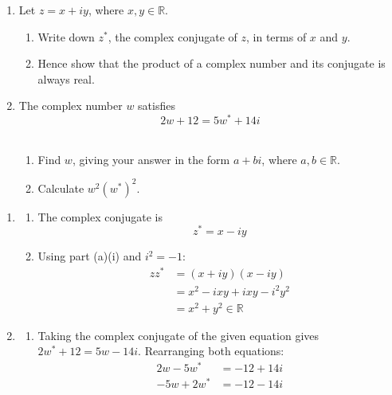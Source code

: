 \documentclass[leqno]{article}
\begin{document}
\djsFrontMatter
\begin{enumerate}[
  label=\textbf{\arabic*.},
  leftmargin=*,
  topsep=0pt,
  partopsep=0pt,
  parsep=0pt
]

\questionitem

\begin{enumerate}[label=\textbf{(\alph*)}]
\item Let $z=x+iy$, where $x,y\in\mathbb{R}$. \\
\begin{enumerate}[label=(\roman*)]
\item Write down $z^*$, the complex conjugate of $z$, in terms of $x$ and $y$.  \\
\item Hence show that the product of a complex number and its conjugate is always real.  \\
\end{enumerate}
\item The complex number $w$ satisfies
\[
2w+12=5w^*+14i
\] \\
\begin{enumerate}[label=(\roman*)]
\item Find $w$, giving your answer in the form $a+bi$, where $a,b\in\mathbb{R}$.  \\
\item Calculate $w^2(w^*)^2$.  \\
\end{enumerate}
\end{enumerate}

\vspace*{10pt}

\begin{djsSolution}
\begin{enumerate}[label=\textbf{(\alph*)}, start=1]
\item
\begin{enumerate}[label=(\roman*), start=1]
\item The complex conjugate is
\[
z^*=x-iy
\]

\item Using part (a)(i) and \(i^2=-1\):
\begin{align*}
zz^*&=(x+iy)(x-iy)\\
&=x^2-ixy+ixy-i^2y^2\\
&=x^2+y^2\in\mathbb{R}
\end{align*}

\end{enumerate}
\item
\begin{enumerate}[label=(\roman*), start=1]
\item Taking the complex conjugate of the given equation gives \(2w^*+12=5w-14i\). Rearranging both equations:
\begin{align*}
2w-5w^*&=-12+14i\\
-5w+2w^*&=-12-14i
\end{align*}


\end{enumerate}
\end{enumerate}
\end{djsSolution}
\end{enumerate}
\end{document}

